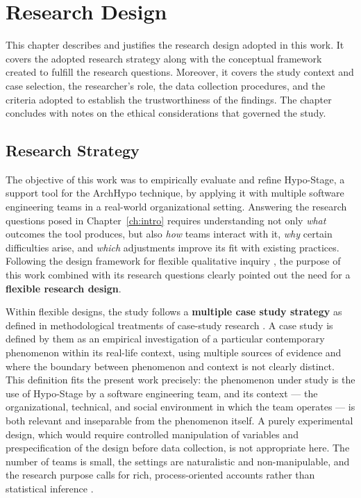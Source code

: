 
\chapter{Research Design}
\label{ch:method}
\label{chap:research-design}

This chapter describes and justifies the research design adopted in this work.
It covers the adopted research strategy along with the conceptual framework created to fulfill the research
questions. Moreover, it covers the study context and case selection, the researcher's role, the data collection procedures, and the criteria adopted to establish the trustworthiness of the findings. 
The chapter concludes with notes on the ethical considerations that governed the study.

\section{Research Strategy}
\label{sec:research-strategy}

The objective of this work was to empirically evaluate and refine Hypo-Stage,
a support tool for the ArchHypo technique, by applying it with multiple software
engineering teams in a real-world organizational setting. Answering the research
questions posed in Chapter~\ref{ch:intro} requires understanding not only \emph{what}
outcomes the tool produces, but also \emph{how} teams interact with it, \emph{why}
certain difficulties arise, and \emph{which} adjustments improve its fit with existing
practices. Following the design framework for flexible qualitative inquiry \citep{robson2016}, the purpose of this work combined with its research questions clearly pointed out the need for a \textbf{flexible research design}.

Within flexible designs, the study follows a \textbf{multiple case study strategy} as defined in methodological treatments of case-study research \citep{robson2016,yin2009}.
A case study is defined by them as an empirical investigation of a particular contemporary
phenomenon within its real-life context, using multiple sources of evidence and where
the boundary between phenomenon and context is not clearly distinct. This definition
fits the present work precisely: the phenomenon under study is the use of Hypo-Stage
by a software engineering team, and its context --- the organizational, technical, and
social environment in which the team operates --- is both relevant and inseparable
from the phenomenon itself. A purely experimental design, which would require
controlled manipulation of variables and prespecification of the design before data
collection, is not appropriate here. The number of teams is small, the settings are
naturalistic and non-manipulable, and the research purpose calls for rich,
process-oriented accounts rather than statistical inference \citep{robson2016}.

